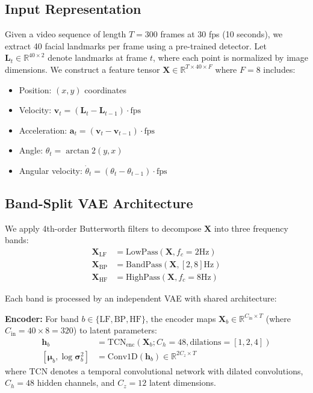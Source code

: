 \documentclass[11pt,twocolumn]{article}
\begin{document}
\subsection{Input Representation}

Given a video sequence of length $T=300$ frames at 30 fps (10 seconds), we extract 40 facial landmarks per frame using a pre-trained detector. Let $\mathbf{L}_t \in \mathbb{R}^{40 \times 2}$ denote landmarks at frame $t$, where each point is normalized by image dimensions. We construct a feature tensor $\mathbf{X} \in \mathbb{R}^{T \times 40 \times F}$ where $F=8$ includes:
\begin{itemize}
    \item Position: $(x, y)$ coordinates
    \item Velocity: $\mathbf{v}_t = (\mathbf{L}_t - \mathbf{L}_{t-1}) \cdot \text{fps}$
    \item Acceleration: $\mathbf{a}_t = (\mathbf{v}_t - \mathbf{v}_{t-1}) \cdot \text{fps}$
    \item Angle: $\theta_t = \arctan2(y, x)$
    \item Angular velocity: $\dot{\theta}_t = (\theta_t - \theta_{t-1}) \cdot \text{fps}$
\end{itemize}

\subsection{Band-Split VAE Architecture}

We apply 4th-order Butterworth filters to decompose $\mathbf{X}$ into three frequency bands:
\begin{align}
    \mathbf{X}_{\text{LF}} &= \text{LowPass}(\mathbf{X}, f_c=2\text{Hz}) \\
    \mathbf{X}_{\text{BP}} &= \text{BandPass}(\mathbf{X}, [2, 8]\text{Hz}) \\
    \mathbf{X}_{\text{HF}} &= \text{HighPass}(\mathbf{X}, f_c=8\text{Hz})
\end{align}

Each band is processed by an independent VAE with shared architecture:

\textbf{Encoder:} For band $b \in \{\text{LF}, \text{BP}, \text{HF}\}$, the encoder maps $\mathbf{X}_b \in \mathbb{R}^{C_{\text{in}} \times T}$ (where $C_{\text{in}} = 40 \times 8 = 320$) to latent parameters:
\begin{align}
    \mathbf{h}_b &= \text{TCN}_{\text{enc}}(\mathbf{X}_b; C_h=48, \text{dilations}=[1,2,4]) \\
    [\boldsymbol{\mu}_b, \log\boldsymbol{\sigma}^2_b] &= \text{Conv1D}(\mathbf{h}_b) \in \mathbb{R}^{2C_z \times T}
\end{align}
where TCN denotes a temporal convolutional network with dilated convolutions, $C_h=48$ hidden channels, and $C_z=12$ latent dimensions.
\end{document}

